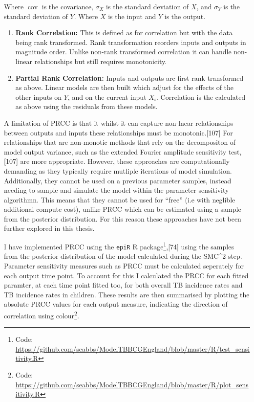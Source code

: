 \documentclass[11pt,twoside]{bristolthesis}
\begin{document}
  Where \(\operatorname {cov}\) is the covariance, \(\sigma _{X}\) is the standard deviation of \(X\), and \(\sigma_Y\) is the standard deviation of \(Y\). Where \(X\) is the input and \(Y\) is the output.
  \begin{enumerate}
  \def\labelenumi{\arabic{enumi}.}
  \setcounter{enumi}{1}
  \item
    \textbf{Rank Correlation:} This is defined as for correlation but with the data being rank transformed. Rank transformation reorders inputs and outputs in magnitude order. Unlike non-rank transformed correlation it can handle non-linear relationships but still requires monotonicity.
  \item
    \textbf{Partial Rank Correlation:} Inputs and outputs are first rank transformed as above. Linear models are then built which adjust for the effects of the other inputs on \(Y\), and on the current input \(X_i\). Correlation is the calculated as above using the residuals from these models.
  \end{enumerate}
  A limitation of PRCC is that it whilst it can capture non-lnear relationships between outputs and inputs these relationships must be monotonic.{[}107{]} For relationships that are non-monotic methods that rely on the decompositon of model output variance, such as the extended Fourier amplitude sensitivity test,{[}107{]} are more appropriate. However, these approaches are computationally demanding as they typically require mutliple iterations of model simulation. Additionally, they cannot be used on a previous parameter samples, instead needing to sample and simulate the model within the parameter sensitivity algorithmn. This means that they cannot be used for ``free'' (i.e with neglible additional compute cost), unlike PRCC which can be estimated using a sample from the posterior distribution. For this reason these approaches have not been further explored in this thesis.
  
  I have implemented PRCC using the \texttt{epiR} R package\footnote{Code: \url{https://github.com/seabbs/ModelTBBCGEngland/blob/master/R/test_sensitivity.R}},{[}74{]} using the samples from the posterior distribution of the model calculated during the SMC\^{}2 step. Parameter sensitivity measures such as PRCC must be calculated seperately for each output time point. To account for this I calculated the PRCC for each fitted paramter, at each time point fitted too, for both overall TB incidence rates and TB incidence rates in children. These results are then summarised by plotting the absolute PRCC values for each output measure, indicating the direction of correlation using colour\footnote{Code: \url{https://github.com/seabbs/ModelTBBCGEngland/blob/master/R/plot_sensitivity.R}}.
  
\end{document}
